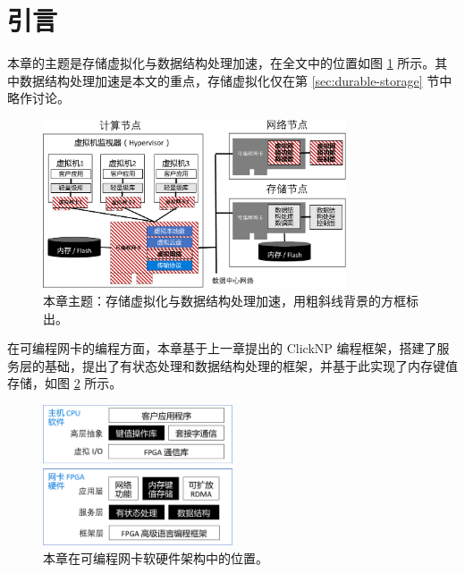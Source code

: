 \section{引言}
\label{kvdirect:sec:introduction}

本章的主题是存储虚拟化与数据结构处理加速，在全文中的位置如图 \ref{kvdirect:fig:sys-arch} 所示。其中数据结构处理加速是本文的重点，存储虚拟化仅在第 \ref{sec:durable-storage} 节中略作讨论。

\begin{figure}[htbp]
	\centering
	\includegraphics[width=0.8\textwidth]{figure/sys_arch.pdf}
	\caption{本章主题：存储虚拟化与数据结构处理加速，用粗斜线背景的方框标出。}
	\label{kvdirect:fig:sys-arch}
\end{figure}

在可编程网卡的编程方面，本章基于上一章提出的 ClickNP 编程框架，搭建了服务层的基础，提出了有状态处理和数据结构处理的框架，并基于此实现了内存键值存储，如图 \ref{kvdirect:fig:sw-hw-codesign} 所示。

\begin{figure}[htbp]
	\centering
	\includegraphics[width=0.5\textwidth]{figure/sw_hw_codesign.pdf}
	\caption{本章在可编程网卡软硬件架构中的位置。}
	\label{kvdirect:fig:sw-hw-codesign}
\end{figure}


